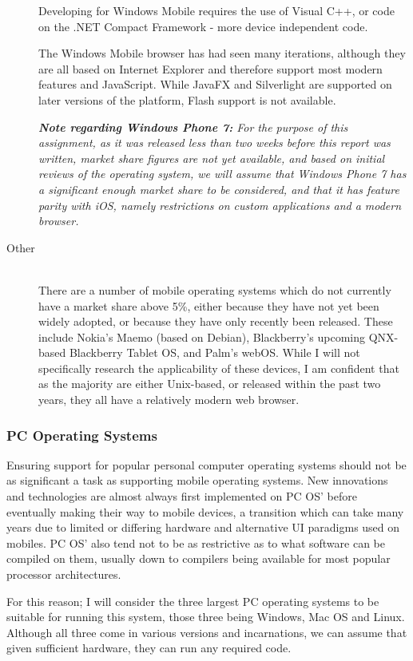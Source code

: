 \documentclass[a4papert,11pt,notitlepage]{ltxdoc}
\begin{document}
\begin{description}
Developing for Windows Mobile requires the use of Visual C++, or code on the .NET Compact Framework - more device independent code.

The Windows Mobile browser has had seen many iterations, although they are all based on Internet Explorer and therefore support most modern features and JavaScript. While JavaFX and Silverlight are supported on later versions of the platform, Flash support is not available.

{\it{\bf Note regarding Windows Phone 7:} For the purpose of this assignment, as it was released less than two weeks before this report was written, market share figures are not yet available, and based on initial reviews of the operating system, we will assume that Windows Phone 7 has a significant enough market share to be considered, and that it has feature parity with iOS, namely restrictions on custom applications and a modern browser.}

\item[Other] \hfill \\
There are a number of mobile operating systems which do not currently have a market share above 5\%, either because they have not yet been widely adopted, or because they have only recently been released. These include Nokia's Maemo (based on Debian), Blackberry's upcoming QNX-based Blackberry Tablet OS, and Palm's webOS. While I will not specifically research the applicability of these devices, I am confident that as the majority are either Unix-based, or released within the past two years, they all have a relatively modern web browser.

\end{description}

\subsubsection{PC Operating Systems}
Ensuring support for popular personal computer operating systems should not be as significant a task as supporting mobile operating systems. New innovations and technologies are almost always first implemented on PC OS' before eventually making their way to mobile devices, a transition which can take many years due to limited or differing hardware and alternative UI paradigms used on mobiles. PC OS' also tend not to be as restrictive as to what software can be compiled on them, usually down to compilers being available for most popular processor architectures.

For this reason; I will consider the three largest PC operating systems to be suitable for running this system, those three being Windows, Mac OS and Linux. Although all three come in various versions and incarnations, we can assume that given sufficient hardware, they can run any required code.
\end{document}
